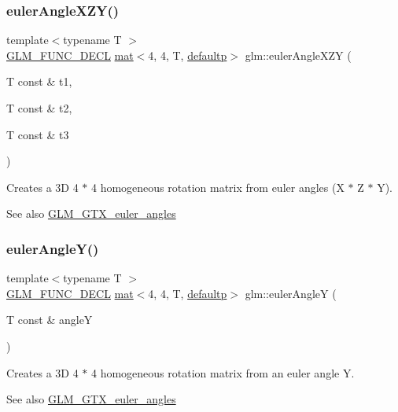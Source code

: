 \subsubsection{\texorpdfstring{euler\+Angle\+X\+Z\+Y()}{eulerAngleXZY()}}
{\footnotesize\ttfamily template$<$typename T $>$ \\
\mbox{\hyperlink{setup_8hpp_ab2d052de21a70539923e9bcbf6e83a51}{G\+L\+M\+\_\+\+F\+U\+N\+C\+\_\+\+D\+E\+CL}} \mbox{\hyperlink{structglm_1_1mat}{mat}}$<$4, 4, T, \mbox{\hyperlink{namespaceglm_a36ed105b07c7746804d7fdc7cc90ff25a9d21ccd8b5a009ec7eb7677befc3bf51}{defaultp}}$>$ glm\+::euler\+Angle\+X\+ZY (\begin{DoxyParamCaption}\item[{T const \&}]{t1,  }\item[{T const \&}]{t2,  }\item[{T const \&}]{t3 }\end{DoxyParamCaption})}

Creates a 3D 4 $\ast$ 4 homogeneous rotation matrix from euler angles (X $\ast$ Z $\ast$ Y). \begin{DoxySeeAlso}{See also}
\mbox{\hyperlink{group__gtx__euler__angles}{G\+L\+M\+\_\+\+G\+T\+X\+\_\+euler\+\_\+angles}} 
\end{DoxySeeAlso}
\mbox{\label{group__gtx__euler__angles_gab84bf4746805fd69b8ecbb230e3974c5}} 
\subsubsection{\texorpdfstring{euler\+Angle\+Y()}{eulerAngleY()}}
{\footnotesize\ttfamily template$<$typename T $>$ \\
\mbox{\hyperlink{setup_8hpp_ab2d052de21a70539923e9bcbf6e83a51}{G\+L\+M\+\_\+\+F\+U\+N\+C\+\_\+\+D\+E\+CL}} \mbox{\hyperlink{structglm_1_1mat}{mat}}$<$4, 4, T, \mbox{\hyperlink{namespaceglm_a36ed105b07c7746804d7fdc7cc90ff25a9d21ccd8b5a009ec7eb7677befc3bf51}{defaultp}}$>$ glm\+::euler\+AngleY (\begin{DoxyParamCaption}\item[{T const \&}]{angleY }\end{DoxyParamCaption})}

Creates a 3D 4 $\ast$ 4 homogeneous rotation matrix from an euler angle Y. \begin{DoxySeeAlso}{See also}
\mbox{\hyperlink{group__gtx__euler__angles}{G\+L\+M\+\_\+\+G\+T\+X\+\_\+euler\+\_\+angles}} 
\end{DoxySeeAlso}
\mbox{\label{group__gtx__euler__angles_ga4f57e6dd25c3cffbbd4daa6ef3f4486d}} 
